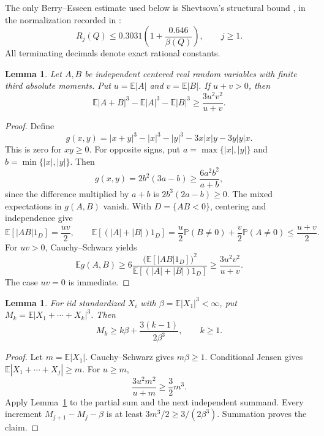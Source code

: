 \documentclass[11pt,a4paper]{article}
\numberwithin{equation}{section}
\newtheorem{lemma}[theorem]{Lemma}
\theoremstyle{definition}
\theoremstyle{remark}
\newcommand{\E}{\mathbb E}
\newcommand{\Prob}{\mathbb P}
\begin{document}
The only Berry--Esseen estimate used below is Shevtsova's structural
bound \cite{Shevtsova2013}, in the normalization recorded in
\cite[Eq.~(6)]{HC}:
\begin{equation}\label{conv:eq:structural}
 R_j(Q)\le0.3031\left(1+\frac{0.646}{\beta(Q)}\right),
 \qquad j\ge1.
\end{equation}
All terminating decimals denote exact rational constants.

\begin{lemma}\label{conv:lem:surplus}
Let $A,B$ be independent centered real random variables with finite
third absolute moments. Put $u=\E|A|$ and $v=\E|B|$. If $u+v>0$, then
\begin{equation}\label{conv:eq:surplus}
 \E|A+B|^3-\E|A|^3-\E|B|^3\ge\frac{3u^2v^2}{u+v}.
\end{equation}
\end{lemma}
\begin{proof}
Define
\[
 g(x,y)=|x+y|^3-|x|^3-|y|^3-3x|x|y-3y|y|x.
\]
This is zero for $xy\ge0$. For opposite signs, put
$a=\max\{|x|,|y|\}$ and $b=\min\{|x|,|y|\}$. Then
\[
 g(x,y)=2b^2(3a-b)\ge\frac{6a^2b^2}{a+b},
\]
since the difference multiplied by $a+b$ is $2b^3(2a-b)\ge0$.
The mixed expectations in $g(A,B)$ vanish. With $D=\{AB<0\}$,
centering and independence give
\[
 \E[|AB|1_D]=\frac{uv}{2},\qquad
 \E[(|A|+|B|)1_D]
 =\frac u2\Prob(B\ne0)+\frac v2\Prob(A\ne0)
 \le\frac{u+v}{2}.
\]
For $uv>0$, Cauchy--Schwarz yields
\[
 \E g(A,B)\ge
 6\frac{\bigl(\E[|AB|1_D]\bigr)^2}
 {\E[(|A|+|B|)1_D]}
 \ge\frac{3u^2v^2}{u+v}.
\]
The case $uv=0$ is immediate.
\end{proof}

\begin{lemma}\label{conv:lem:iteration}
For iid standardized $X_i$ with $\beta=\E|X_1|^3<\infty$, put
$M_k=\E|X_1+\cdots+X_k|^3$. Then
\begin{equation}\label{conv:eq:iteration}
 M_k\ge k\beta+\frac{3(k-1)}{2\beta^3},\qquad k\ge1.
\end{equation}
\end{lemma}
\begin{proof}
Let $m=\E|X_1|$. Cauchy--Schwarz gives $m\beta\ge1$.
Conditional Jensen gives $\E|X_1+\cdots+X_j|\ge m$.
For $u\ge m$,
\[
 \frac{3u^2m^2}{u+m}\ge\frac32m^3.
\]
Apply Lemma~\ref{conv:lem:surplus} to the partial sum and the next independent
summand. Every increment $M_{j+1}-M_j-\beta$ is at least
$3m^3/2\ge3/(2\beta^3)$. Summation proves the claim.
\end{proof}
\end{document}
